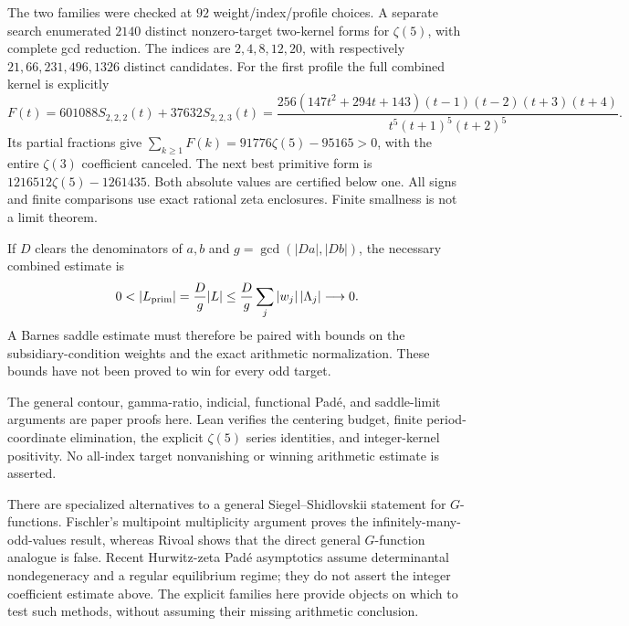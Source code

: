 \documentclass[11pt]{article}
\begin{document}
The two families were checked at $92$ weight/index/profile choices.
A separate search enumerated $2140$ distinct nonzero-target two-kernel
forms for $\zeta(5)$, with complete gcd reduction.
The indices are $2,4,8,12,20$, with respectively
$21,66,231,496,1326$ distinct candidates.
For the first profile the full combined kernel is explicitly
\[
 F(t)=601088S_{2,2,2}(t)+37632S_{2,2,3}(t)
 =\frac{256(147t^2+294t+143)(t-1)(t-2)(t+3)(t+4)}
 {t^5(t+1)^5(t+2)^5}.
\]
Its partial fractions give
$\sum_{k\ge1}F(k)=91776\zeta(5)-95165>0$, with the entire
$\zeta(3)$ coefficient canceled. The next best primitive form is
$1216512\zeta(5)-1261435$.
Both absolute values are certified below one. All signs and finite
comparisons use exact rational zeta enclosures.
Finite smallness is not a limit theorem.

If $D$ clears the denominators of $a,b$ and
$g=\gcd(|Da|,|Db|)$, the necessary combined estimate is
\[
 0<|L_{\rm prim}|=\frac Dg|L|
 \le\frac Dg\sum_j|w_j|\,|\Lambda_j|\longrightarrow0.
\]
A Barnes saddle estimate must therefore be paired with bounds on the
subsidiary-condition weights and the exact arithmetic normalization.
These bounds have not been proved to win for every odd target.

The general contour, gamma-ratio, indicial, functional Pad\'e, and
saddle-limit arguments are paper proofs here. Lean verifies the centering budget, finite period-coordinate
elimination, the explicit $\zeta(5)$ series identities, and integer-kernel
positivity. No all-index target nonvanishing or winning arithmetic estimate
is asserted.

There are specialized alternatives to a general Siegel--Shidlovskii
statement for $G$-functions. Fischler's multipoint multiplicity argument
\cite{Fischler} proves the infinitely-many-odd-values result, whereas
Rivoal \cite{Rivoal} shows that the direct general $G$-function analogue
is false. Recent Hurwitz-zeta Pad\'e asymptotics \cite{Kandaian} assume
determinantal nondegeneracy and a regular equilibrium regime; they do
not assert the integer coefficient estimate above.
The explicit families here provide objects on which to test such methods,
without assuming their missing arithmetic conclusion.
\end{document}
